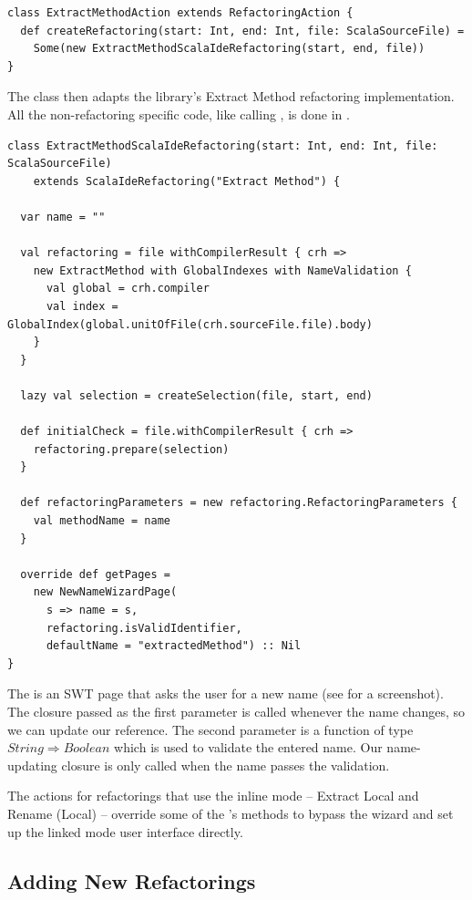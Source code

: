 \documentclass[10pt,a4paper,oneside]{scrreprt}
\begin{document}
\begin{lstlisting}
class ExtractMethodAction extends RefactoringAction {
  def createRefactoring(start: Int, end: Int, file: ScalaSourceFile) = 
    Some(new ExtractMethodScalaIdeRefactoring(start, end, file))
}
\end{lstlisting}

The  class then adapts the library's Extract Method refactoring implementation. All the non-refactoring specific code, like calling , is done in .

\newpage
\begin{lstlisting}
class ExtractMethodScalaIdeRefactoring(start: Int, end: Int, file: ScalaSourceFile) 
    extends ScalaIdeRefactoring("Extract Method") {
  
  var name = ""
  
  val refactoring = file withCompilerResult { crh => 
    new ExtractMethod with GlobalIndexes with NameValidation {
      val global = crh.compiler
      val index = GlobalIndex(global.unitOfFile(crh.sourceFile.file).body)
    }
  }

  lazy val selection = createSelection(file, start, end)

  def initialCheck = file.withCompilerResult { crh =>
    refactoring.prepare(selection)
  }
  
  def refactoringParameters = new refactoring.RefactoringParameters {
    val methodName = name
  }
  
  override def getPages = 
    new NewNameWizardPage(
      s => name = s, 
      refactoring.isValidIdentifier, 
      defaultName = "extractedMethod") :: Nil 
}
\end{lstlisting}

The  is an SWT page that asks the user for a new name (see  for a screenshot). The closure passed as the first parameter is called whenever the name changes, so we can update our reference. The second parameter is a function of type $String \Rightarrow Boolean$ which is used to validate the entered name. Our name-updating closure is only called when the name passes the validation.

The actions for refactorings that use the inline mode -- Extract Local and Rename (Local) -- override some of the 's methods to bypass the wizard and set up the linked mode user interface directly.

\subsection{Adding New Refactorings}
\end{document}
